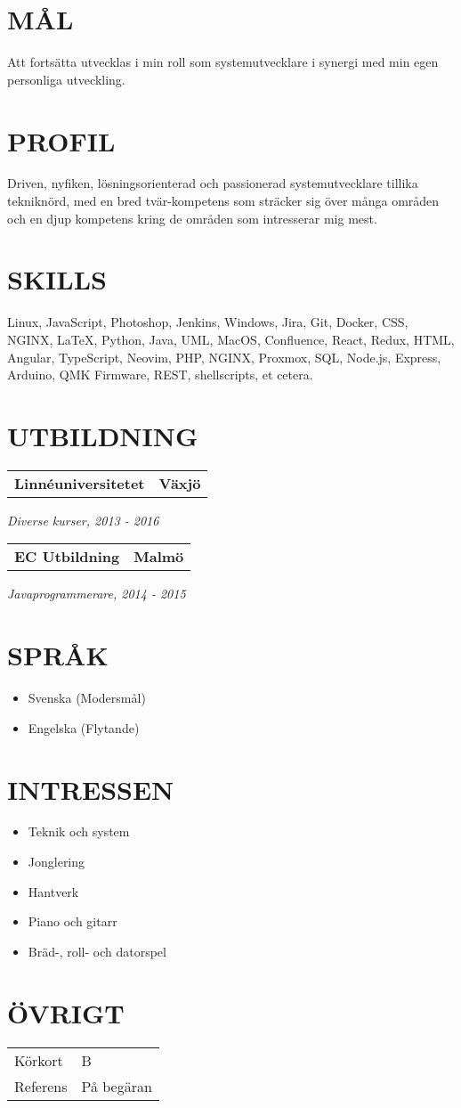 \documentclass[11pt,a4paper]{moderncv}
\newcommand*{\educationentry}[4][0.5mm]{
    \begin{tabularx}{\textwidth}{LR}
        {\bfseries #3} & {\bfseries #4} \\
    \end{tabularx}
    {\itshape #2}
    \par\addvspace{#1}
}
\begin{document}
\begin{minipage}[t]{0.35\textwidth}
\section{MÅL}
Att fortsätta utvecklas i min roll som systemutvecklare i synergi med min egen personliga utveckling.

\section{PROFIL}
Driven, nyfiken, lösningsorienterad och passionerad systemutvecklare tillika tekniknörd, med en bred tvär-kompetens som sträcker sig över många områden och en djup kompetens kring de områden som intresserar mig mest.

\section{SKILLS}
Linux, JavaScript, Photoshop, Jenkins, Windows, Jira, Git, Docker, CSS, NGINX, \LaTeX, Python, Java, UML, MacOS, Confluence, React, Redux, HTML, Angular, TypeScript, Neovim, PHP, NGINX, Proxmox, SQL, Node.js, Express, Arduino, QMK Firmware, REST, shellscripts, et cetera.

\section{UTBILDNING}
\educationentry{Diverse kurser, 2013 - 2016}{Linnéuniversitetet}{Växjö}
\educationentry{Javaprogrammerare, 2014 - 2015}{EC Utbildning}{Malmö}

\section{SPRÅK}
\begin{itemize}
    \item Svenska (Modersmål)
    \item Engelska (Flytande)
\end{itemize}

\section{INTRESSEN}
\begin{itemize}
    \item Teknik och system
    \item Jonglering
    \item Hantverk
    \item Piano och gitarr
    \item Bräd-, roll- och datorspel
\end{itemize}

\section{ÖVRIGT}
\begin{tabularx}{\textwidth}{L L}
  Körkort & B \\
  Referens & På begäran

\end{tabularx}

\end{minipage}
\end{document}

